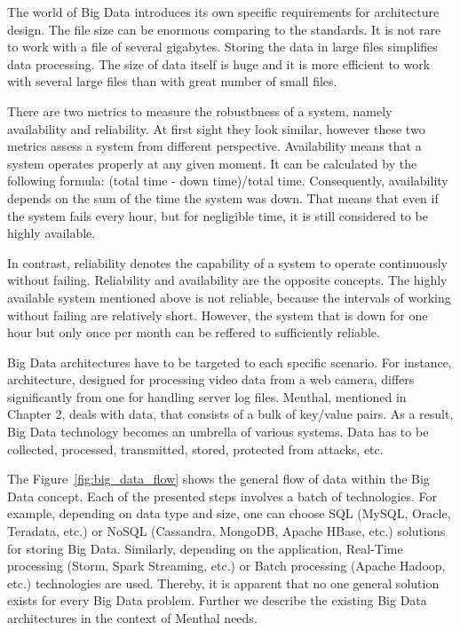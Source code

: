 The world of Big Data introduces its own specific requirements for architecture design.
The file size can be enormous comparing to the standards.
It is not rare to work with a file of several gigabytes.
Storing the data in large files simplifies data processing.
The size of data itself is huge and it is more efficient to work with several large files than with great number of small files.

There are two metrics to measure the robustbness of a system, namely availability and reliability.
At first sight they look similar, however these two metrics assess a system from different perspective.
Availability means that a system operates properly at any given moment.
It can be calculated by the following formula: (total time - down time)/total time.
Consequently, availability depends on the sum of the time the system was down.
That means that even if the system fails every hour, but for negligible time, it is still considered to be highly available.

In contrast, reliability denotes the capability of a system to operate continuously without failing.
Reliability and availability are the opposite concepts.
The highly available system mentioned above is not reliable, because the intervals of working without failing are relatively short.
However, the system that is down for one hour but only once per month can be reffered to sufficiently reliable.

Big Data architectures have to be targeted to each specific scenario.
For instance, architecture, designed for processing video data from a web camera, differs significantly from one for handling server log files.
Menthal, mentioned in Chapter 2, deals with data, that consists of a bulk of key/value pairs. 
As a result, Big Data technology becomes an umbrella of various systems. 
Data has to be collected, processed, transmitted, stored, protected from attacks, etc.

The Figure~\ref{fig:big_data_flow} shows the general flow of data within the Big Data concept.
Each of the presented steps involves a batch of technologies.
For example, depending on data type and size, one can choose SQL (MySQL, Oracle, Teradata, etc.) or NoSQL (Cassandra, MongoDB, Apache HBase, etc.) solutions for storing Big Data.
Similarly, depending on the application, Real-Time processing (Storm, Spark Streaming, etc.) or Batch processing (Apache Hadoop, etc.) technologies are used. 
Thereby, it is apparent that no one general solution exists for every Big Data problem.
Further we describe the existing Big Data architectures in the context of Menthal needs.

